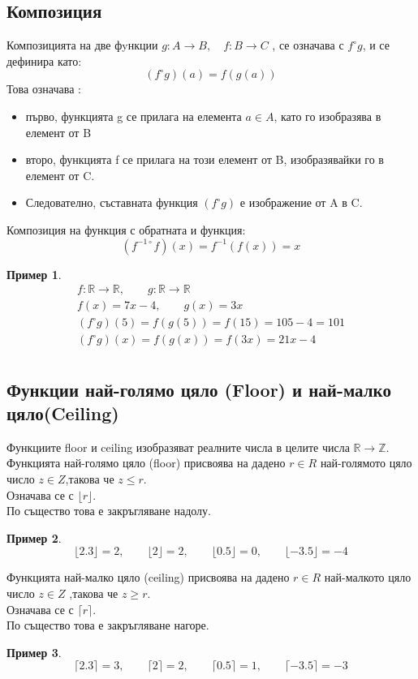 \documentclass[fleqn, 12pt]{article}
\theoremstyle{definition}
\newtheorem{example}{Пример}[subsection]
\begin{document}
\subsection{Композиция}
Композицията на две фyнкции $g: A \rightarrow B, \quad f: B \rightarrow C$ , се означава с $f ^\circ g$, и се дефинира като: 
$$(f ^\circ g)(a) = f(g(a))$$
Това означава : 
\begin{itemize}
\item първо, функцията g се прилага на елемента $a \in A$, като го изобразява в елемент от B 
\item второ, функцията f се прилага на този елемент от B, изобразявайки го в елемент от C.
\item Следователно,  съставната функция $(f ^\circ g)$ е изображение от A в C.
\end{itemize}

Композиция на функция с обратната и функция:
$$(f^{-1\circ} f)(x) = f^{-1}(f(x)) = x$$

\begin{example}
\begin{gather*}
f: \mathbb{R} \rightarrow \mathbb{R}, \qquad g: \mathbb{R} \rightarrow \mathbb{R} \\
f(x) = 7x - 4, \qquad g(x) = 3x\\
(f ^\circ g)(5) = f(g(5)) = f(15) = 105 - 4 = 101\\
(f ^\circ g)(x) = f(g(x)) = f(3x) = 21x - 4\\
\end{gather*}
\end{example}

\subsection{Функции най-голямо цяло (Floor) и най-малко цяло(Ceiling)}
Функциите floor и ceiling изобразяват реалните числа в целите числа $\mathbb{R} \rightarrow \mathbb{Z}$.\\
Функцията най-голямо цяло (floor) присвоява на дадено $r \in R$ най-голямото цяло число $z \in Z$,такова че $z \leq r$.\\
Означава се с $\lfloor r \rfloor$.\\
По същество това е закръгляване надолу.
\begin{example}
$$\lfloor 2.3 \rfloor = 2,\qquad \lfloor 2 \rfloor = 2,\qquad \lfloor 0.5 \rfloor = 0,\qquad \lfloor -3.5 \rfloor = -4$$
\end{example}
Функцията най-малко цяло (ceiling) присвоява на дадено $r \in R$ най-малкото цяло число $z \in Z$ ,такова че $z \geq r$. \\
Означава се с $\lceil r \rceil $.\\
По същество това е закръгляване нагоре.
\begin{example}
$$\lceil 2.3 \rceil = 3,\qquad  \lceil 2 \rceil = 2, \qquad \lceil 0.5 \rceil = 1,\qquad \lceil -3.5 \rceil = -3$$
\end{example}
\end{document}
